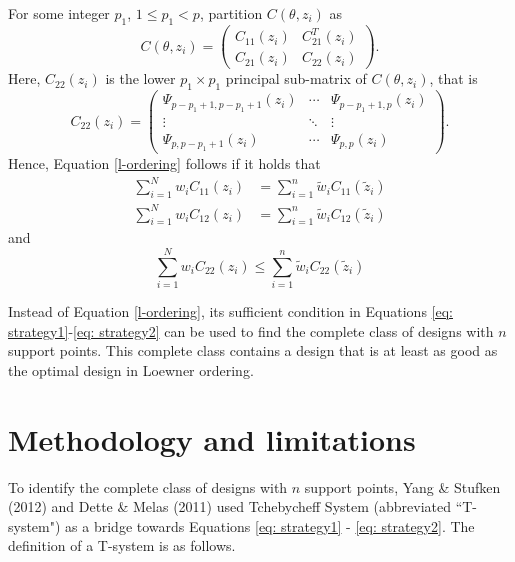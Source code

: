 \documentclass[12pt]{TD-CJS}
\begin{document}
For some integer $p_1$, $1\le p_1<p$, partition $C(\theta,z_i)$ as \begin{equation}\label{def_block}
    C(\theta,z_i) = \left(\begin{array}{cc}
      C_{11}(z_i)   &  C_{21}^T(z_i) \\
        C_{21}(z_i)  & C_{22}(z_i) 
    \end{array}\right).
\end{equation} Here, $C_{22}(z_i)$ is the lower $p_1\times p_1$ principal sub-matrix of $C(\theta,z_i)$, that is 
\begin{equation}\label{def_c22}
    C_{22}(z_i) = \left( \begin{array}{ccc}
      \Psi_{p-p_1+1, p-p_1+1}(z_i)   & \cdots & \Psi_{p-p_1+1, p}(z_i) \\
      \vdots & \ddots & \vdots\\
        \Psi_{p, p-p_1+1}(z_i)   &\cdots  & \Psi_{p, p}(z_i)  
    \end{array}\right).
\end{equation} Hence, Equation \eqref{l-ordering} follows if it holds that 
\begin{align}\label{eq: strategy1}
    \sum_{i=1}^Nw_iC_{11}(z_i) &= \sum_{i=1}^n \tilde{w}_iC_{11}(\tilde{z}_i)\\
    \sum_{i=1}^Nw_iC_{12}(z_i) &= \sum_{i=1}^n \tilde{w}_iC_{12}(\tilde{z}_i)
\end{align} and 
\begin{equation}\label{eq: strategy2}
    \sum_{i=1}^Nw_iC_{22}(z_i) \le \sum_{i=1}^n \tilde{w}_iC_{22}(\tilde{z}_i)
\end{equation}


Instead of Equation \eqref{l-ordering}, its sufficient condition in Equations \eqref{eq: strategy1}-\eqref{eq: strategy2} can be used to find the complete class of designs with $n$ support points. This complete class contains a design that is at least as good as the optimal design in Loewner ordering.


\section{Methodology and limitations} \label{metho}
To identify the complete class of designs with $n$ support points, Yang \& Stufken (2012) and Dette \& Melas (2011) used Tchebycheff System (abbreviated ``T-system") as a bridge towards Equations \eqref{eq: strategy1} - \eqref{eq: strategy2}. The definition of a T-system is as follows.
\end{document}
